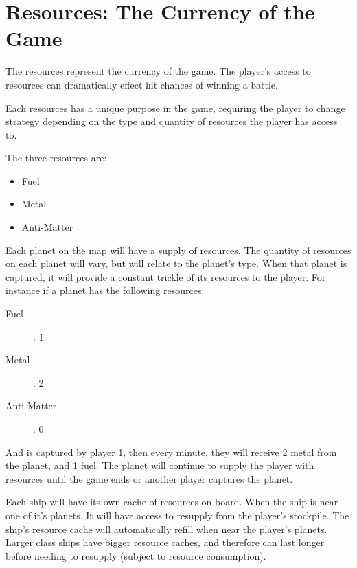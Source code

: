 \section{Resources: The Currency of the Game}

\begin{comment}

what are resources

how they effects the game

for each resources:
  - what it's used for

\end{comment}

The resources represent the currency of the game. The player's access to resources can dramatically effect hit chances of winning a battle.

Each resources has a unique purpose in the game, requiring the player to change strategy depending on the type and quantity of resources the player has access to.

The three resources are:
\begin{itemize}
\item Fuel
\item Metal
\item Anti-Matter
\end{itemize}

Each planet on the map will have a supply of resources. 
The quantity of resources on each planet will vary, but will relate to the planet's type.
When that planet is captured, it will provide a constant trickle of its resources to the player.
For instance if a planet has the following resources:
\begin{description}
\item[Fuel]: 1
\item[Metal]: 2
\item[Anti-Matter]: 0
\end{description}
And is captured by player 1, then every minute, they will receive 2 metal from the planet, and 1 fuel. 
The planet will continue to supply the player with resources until the game ends or another player captures the planet.

Each ship will have its own cache of resources on board.
When the ship is near one of it's planets, It will have access to resupply from the player's stockpile. The ship's resource cache will automatically refill when near the player's planets. 
Larger class ships have bigger resource caches, and therefore can last longer before needing to resupply (subject to resource consumption).

